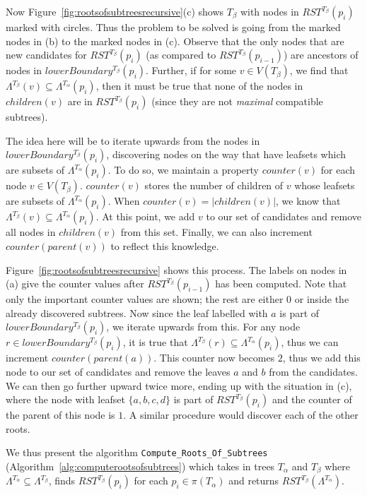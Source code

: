 \documentclass{article}
\newcommand{\leafset}{\Lambda}
\newcommand{\TA}{T_\alpha}
\newcommand{\TB}{T_\beta}
\begin{document}
    Now Figure~\ref{fig:rootsofsubtreesrecursive}(c) shows $\TB$ with nodes in $RST^{\TB}(p_i)$ marked with circles. Thus the problem to be solved is going from the marked nodes in (b) to the marked nodes in (c). Observe that the only nodes that are new candidates for $RST^{\TB}(p_i)$ (as compared to $RST^{\TB}(p_{i-1})$) are ancestors of nodes in $lowerBoundary^{\TB}(p_i)$. Further, if for some $v \in V(\TB)$, we find that $\leafset^{\TB}(v) \subseteq \leafset^{\TA}(p_i)$, then it must be true that none of the nodes in $children(v)$ are in $RST^{\TB}(p_i)$ (since they are not \textit{maximal} compatible subtrees).

    The idea here will be to iterate upwards from the nodes in $lowerBoundary^{\TB}(p_i)$, discovering nodes on the way that have leafsets which are subsets of $\leafset^{\TA}(p_i)$. To do so, we maintain a property $counter(v)$ for each node $v \in V(\TB)$. $counter(v)$ stores the number of children of $v$ whose leafsets are subsets of $\leafset^{\TA}(p_i)$. When $counter(v) = |children(v)|$, we know that $\leafset^{\TB}(v) \subseteq \leafset^{\TA}(p_i)$. At this point, we add $v$ to our set of candidates and remove all nodes in $children(v)$ from this set. Finally, we can also increment $counter(parent(v))$ to reflect this knowledge.

    Figure~\ref{fig:rootsofsubtreesrecursive} shows this process. The labels on nodes in (a) give the counter values after $RST^{\TB}(p_{i-1})$ has been computed. Note that only the important counter values are shown; the rest are either $0$ or inside the already discovered subtrees. Now since the leaf labelled with $a$ is part of $lowerBoundary^{\TB}(p_i)$, we iterate upwards from this. For any node $r \in lowerBoundary^{\TB}(p_i)$, it is true that $\leafset^{\TB}(r) \subseteq \leafset^{\TA}(p_i)$, thus we can increment $counter(parent(a))$. This counter now becomes $2$, thus we add this node to our set of candidates and remove the leaves $a$ and $b$ from the candidates. We can then go further upward twice more, ending up with the situation in (c), where the node with leafset $\{a, b, c, d\}$ is part of $RST^{\TB}(p_i)$ and the counter of the parent of this node is $1$. A similar procedure would discover each of the other roots.

    We thus present the algorithm \texttt{Compute\_Roots\_Of\_Subtrees} (Algorithm~\ref{alg:computerootsofsubtrees}) which takes in trees $\TA$ and $\TB$ where $\leafset^{\TA} \subseteq \leafset^{\TB}$, finds $RST^{\TB}(p_i)$ for each $p_i \in \pi(\TA)$ and returns $RST^{\TB}(\leafset^{\TA})$.
\end{document}
